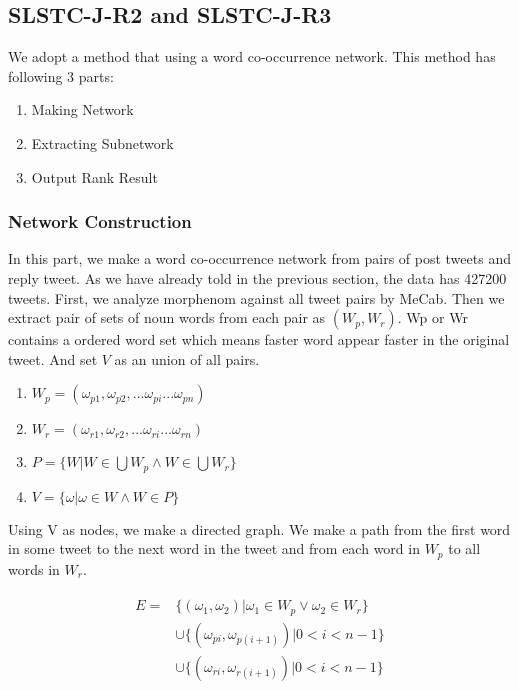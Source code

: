 \documentclass{../style/sig-alternate}
\begin{document}
\subsection{SLSTC-J-R2 and SLSTC-J-R3}
We adopt a method that using a word co-occurrence network.
This method has following 3 parts:
\begin{enumerate}
    \item Making Network
    \item Extracting Subnetwork
    \item Output Rank Result
\end{enumerate} 

\subsubsection{Network Construction}
In this part, we make a word co-occurrence network from pairs of post tweets and reply tweet.
As we have already told in the previous section, the data has 427200 tweets. 
First, we analyze morphenom against all tweet pairs by MeCab. Then we extract pair of sets of noun words from each pair as \((W_{p}, W_{r})\). Wp or Wr contains a ordered word set which means faster word appear faster in the original tweet. And set \(V\) as an union of all pairs.

\begin{enumerate}
    \item \(W_{p} = (\omega_{p1}, \omega_{p2}, ... \omega_{pi} ... \omega_{pn}) \)
    \item \(W_{r} = (\omega_{r1}, \omega_{r2}, ... \omega_{ri} ... \omega_{rn}) \)
    \item \(P = \{W | W \in \bigcup W_{p} \wedge W \in \bigcup W_{r}\}\)
    \item \(V = \{\omega | \omega \in W \wedge W \in P\} \)
\end{enumerate}

Using V as nodes, we make a directed graph. We make a path from the first word in some tweet to the next word in the tweet and from each word in \( W_{p} \) to all words in \(W_{r} \).

\begin{eqnarray}
\begin{split}
E = &\{(\omega_{1}, \omega_{2}) | \omega_{1}\in W_{p} \lor \omega_{2}\in W_{r}\}\\
&\cup \{(\omega_{pi}, \omega_{p(i+1)}) | 0 < i < n-1\}\\
&\cup \{(\omega_{ri}, \omega_{r(i+1)}) | 0 < i < n-1\}
\end{split}
\end{eqnarray}
\end{document}
